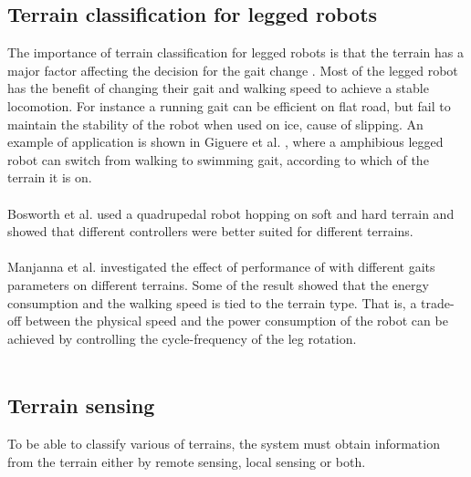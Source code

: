 \documentclass[USenglish]{ifimaster}  %
\begin{document}
\subsection{Terrain classification for legged robots}
The importance of terrain classification for legged robots is that the terrain has a major factor affecting the decision for the gait change \cite{6569179}. Most of the legged robot has the benefit of changing their gait and walking speed to achieve a stable locomotion. For instance a running gait can be efficient on flat road, but fail to maintain the stability of the robot when used on ice, cause of slipping. An example of application is shown in Giguere et al. \cite{Giguere06environmentidentification}, where a amphibious legged robot can switch from walking to swimming gait, according to which of the terrain it is on. 
\\
\\
Bosworth et al. \cite{7487541} used a quadrupedal robot hopping on soft and hard terrain and showed that different controllers were better suited for different terrains. 
\\
\\
Manjanna et al. \cite{6569179} investigated the effect of performance of with different gaits parameters on different terrains. Some of the result showed that the energy consumption and the walking speed is tied to the terrain type. That is, a trade-off between the physical speed and the power consumption of the robot can be achieved by controlling the cycle-frequency of the leg rotation.
\\
\\
\subsection{Terrain sensing}
To be able to classify various of terrains, the system must obtain information from the terrain either by remote sensing, local sensing or both.
\end{document}
